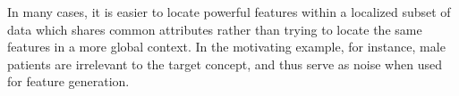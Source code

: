 \documentclass[twoside,11pt]{article}
\theoremstyle{definition}
\begin{document}
In many cases, it is easier to locate powerful features within a localized subset of data which shares common attributes rather than trying to locate the same features in a more global context. In the motivating example, for instance, male patients are irrelevant to the target concept, and thus serve as noise when used for feature generation.
\end{document}
